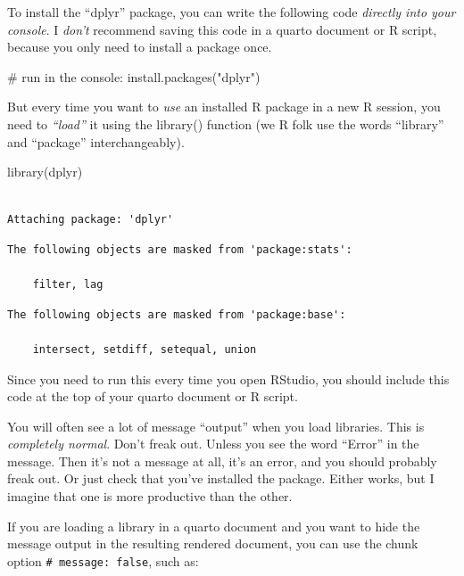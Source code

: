 \documentclass[
  letterpaper,
  DIV=11,
  numbers=noendperiod]{scrreprt}
\newenvironment{Shaded}{\begin{snugshade}}{\end{snugshade}}
\newcommand{\CommentTok}[1]{\textcolor[rgb]{0.37,0.37,0.37}{#1}}
\newcommand{\FunctionTok}[1]{\textcolor[rgb]{0.28,0.35,0.67}{#1}}
\newcommand{\NormalTok}[1]{\textcolor[rgb]{0.00,0.23,0.31}{#1}}
\newcommand{\StringTok}[1]{\textcolor[rgb]{0.13,0.47,0.30}{#1}}
\begin{document}
To install the ``dplyr'' package, you can write the following code
\emph{directly into your console}. I \emph{don't} recommend saving this
code in a quarto document or R script, because you only need to install
a package once.

\begin{Shaded}
\begin{Highlighting}[]
\CommentTok{\# run in the console: }
\FunctionTok{install.packages}\NormalTok{(}\StringTok{"dplyr"}\NormalTok{)}
\end{Highlighting}
\end{Shaded}

But every time you want to \emph{use} an installed R package in a new R
session, you need to \emph{``load''} it using the library() function (we
R folk use the words ``library'' and ``package'' interchangeably).

\begin{Shaded}
\begin{Highlighting}[]
\FunctionTok{library}\NormalTok{(dplyr)}
\end{Highlighting}
\end{Shaded}

\begin{verbatim}

Attaching package: 'dplyr'
\end{verbatim}

\begin{verbatim}
The following objects are masked from 'package:stats':

    filter, lag
\end{verbatim}

\begin{verbatim}
The following objects are masked from 'package:base':

    intersect, setdiff, setequal, union
\end{verbatim}

Since you need to run this every time you open RStudio, you should
include this code at the top of your quarto document or R script.

You will often see a lot of message ``output'' when you load libraries.
This is \emph{completely normal}. Don't freak out. Unless you see the
word ``Error'' in the message. Then it's not a message at all, it's an
error, and you should probably freak out. Or just check that you've
installed the package. Either works, but I imagine that one is more
productive than the other.

If you are loading a library in a quarto document and you want to hide
the message output in the resulting rendered document, you can use the
chunk option \texttt{\#\textbar{}\ message:\ false}, such as:
\end{document}
